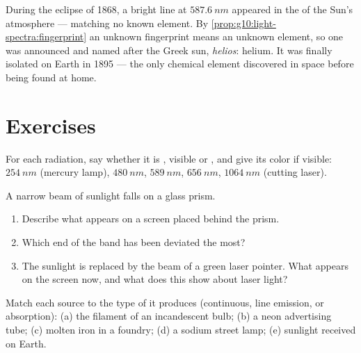 \begin{remark}\label{rem:g10:light-spectra:helium}
During the eclipse of 1868, a bright line at $\qty{587.6}{nm}$ appeared
in the  of the Sun's atmosphere --- matching no known element. By
\cref{prop:g10:light-spectra:fingerprint} an unknown fingerprint means an
unknown element, so one was announced and named after the Greek sun,
\emph{helios}: helium. It was finally isolated on Earth in 1895 --- the
only chemical element discovered in space before being found at home.
\end{remark}

\section{Exercises}

\begin{exercise}[$\star$]\label{exo:g10:light-spectra:1}
For each radiation, say whether it is , visible or ,
and give its color if visible: $\qty{254}{nm}$ (mercury lamp),
$\qty{480}{nm}$, $\qty{589}{nm}$, $\qty{656}{nm}$, $\qty{1064}{nm}$
(cutting laser).
\end{exercise}

\begin{exercise}[$\star$]\label{exo:g10:light-spectra:2}
A narrow beam of sunlight falls on a glass prism.
\begin{enumerate}
  \item Describe what appears on a screen placed behind the prism.
  \item Which end of the band has been deviated the most?
  \item The sunlight is replaced by the beam of a green laser pointer.
        What appears on the screen now, and what does this show about
        laser light?
\end{enumerate}
\end{exercise}

\begin{exercise}[$\star$]\label{exo:g10:light-spectra:3}
Match each source to the type of  it produces (continuous, line
emission, or absorption): (a) the filament of an incandescent bulb;
(b) a neon advertising tube; (c) molten iron in a foundry; (d) a sodium
street lamp; (e) sunlight received on Earth.
\end{exercise}

